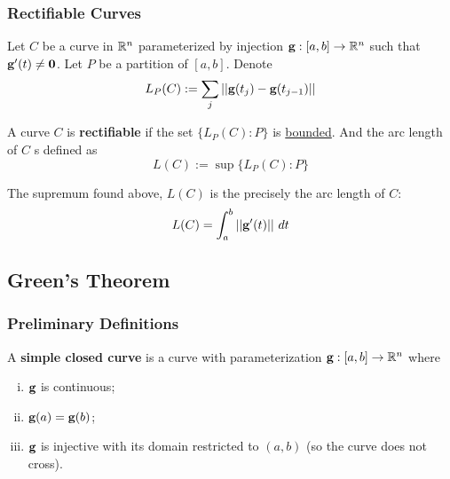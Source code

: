 \documentclass[11pt]{article}
\begin{document}
		\subsubsection{Rectifiable Curves}
			\begin{remark}
				Let $C$ be a curve in $\mathbb{R}^n$ parameterized by injection $\textbf{g}: [a, b] \to \mathbb{R}^n$ such that $\textbf{g}'(t) \neq \textbf{0}$. Let $P$ be a partition of $[a, b]$. Denote
				\begin{equation}
					L_P(C) := \sum_{j} \vert \vert {\textbf{g}(t_j) - \textbf{g}(t_{j-1})} \vert \vert
				\end{equation}
			\end{remark}
			
			\begin{definition}
				A curve $C$ is \textbf{rectifiable} if the set $\{L_P(C):P\}$ is \ul{bounded}. And the arc length of $C$ s defined as 
				\begin{equation}
					L(C) := \sup \{L_P(C):P\}
				\end{equation}
			\end{definition}
			
			\begin{theorem}
				The supremum found above, $L(C)$ is the precisely the arc length of $C$:
				\begin{equation}
					L(C) = \int_a^b ||\ve{g}'(t)||\ dt
				\end{equation}
			\end{theorem}
		
		\subsection{Green's Theorem}
			\subsubsection{Preliminary Definitions}
				\begin{definition}
					A \textbf{simple closed curve} is a curve with parameterization $\textbf{g}: [a, b] \to \mathbb{R}^n$ where
					\begin{enumerate}[(i)]
						\item $\textbf{g}$ is continuous;
						\item $\textbf{g}(a) = \textbf{g}(b)$;
						\item $\textbf{g}$ is injective with its domain restricted to $(a, b)$ (so the curve does not cross).
					\end{enumerate}
				\end{definition}
				
\end{document}
